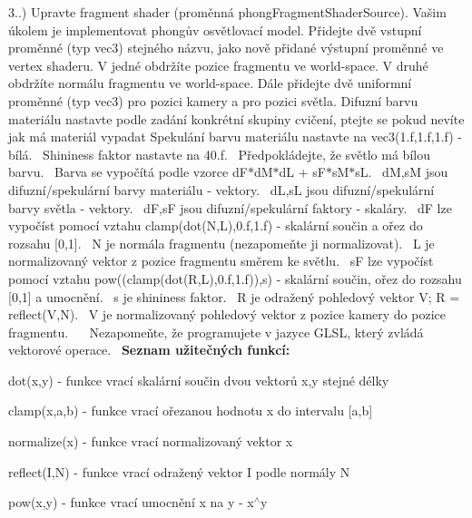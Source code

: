 \begin{DoxyRefList}
3..) Upravte fragment shader (proměnná phong\+Fragment\+Shader\+Source). Vašim úkolem je implementovat phongův osvětlovací model. Přidejte dvě vstupní proměnné (typ vec3) stejného názvu, jako nově přidané výstupní proměnné ve vertex shaderu. V jedné obdržíte pozice fragmentu ve world-\/space. V druhé obdržíte normálu fragmentu ve world-\/space. Dále přidejte dvě uniformní proměnné (typ vec3) pro pozici kamery a pro pozici světla. Difuzní barvu materiálu nastavte podle zadání konkrétní skupiny cvičení, ptejte se pokud nevíte jak má materiál vypadat Spekulání barvu materiálu nastavte na vec3(1.\+f,1.\+f,1.\+f) -\/ bílá.~\newline
 Shininess faktor nastavte na 40.\+f.~\newline
 Předpokládejte, že světlo má bílou barvu.~\newline
 Barva se vypočítá podle vzorce d\+F$\ast$d\+M$\ast$d\+L + s\+F$\ast$s\+M$\ast$s\+L.~\newline
 d\+M,s\+M jsou difuzní/spekulární barvy materiálu -\/ vektory.~\newline
 d\+L,s\+L jsou difuzní/spekulární barvy světla -\/ vektory.~\newline
 d\+F,s\+F jsou difuzní/spekulární faktory -\/ skaláry.~\newline
 d\+F lze vypočíst pomocí vztahu clamp(dot(\+N,\+L),0.\+f,1.\+f) -\/ skalární součin a ořez do rozsahu \mbox{[}0,1\mbox{]}.~\newline
 N je normála fragmentu (nezapomeňte ji normalizovat).~\newline
 L je normalizovaný vektor z pozice fragmentu směrem ke světlu.~\newline
 s\+F lze vypočíst pomocí vztahu pow((clamp(dot(\+R,\+L),0.\+f,1.\+f)),s) -\/ skalární součin, ořez do rozsahu \mbox{[}0,1\mbox{]} a umocnění.~\newline
 s je shininess faktor.~\newline
 R je odražený pohledový vektor V; R = reflect(\+V,\+N).~\newline
 V je normalizovaný pohledový vektor z pozice kamery do pozice fragmentu.~\newline
 ~\newline
 Nezapomeňte, že programujete v jazyce G\+L\+S\+L, který zvládá vektorové operace.~\newline
 {\bfseries Seznam užitečných funkcí\+:}
\begin{DoxyItemize}
\item dot(x,y) -\/ funkce vrací skalární součin dvou vektorů x,y stejné délky
\item clamp(x,a,b) -\/ funkce vrací ořezanou hodnotu x do intervalu \mbox{[}a,b\mbox{]}
\item normalize(x) -\/ funkce vrací normalizovaný vektor x
\item reflect(\+I,\+N) -\/ funkce vrací odražený vektor I podle normály N
\item pow(x,y) -\/ funkce vrací umocnění x na y -\/ x$^\wedge$y 
\end{DoxyItemize}


\end{DoxyRefList}
